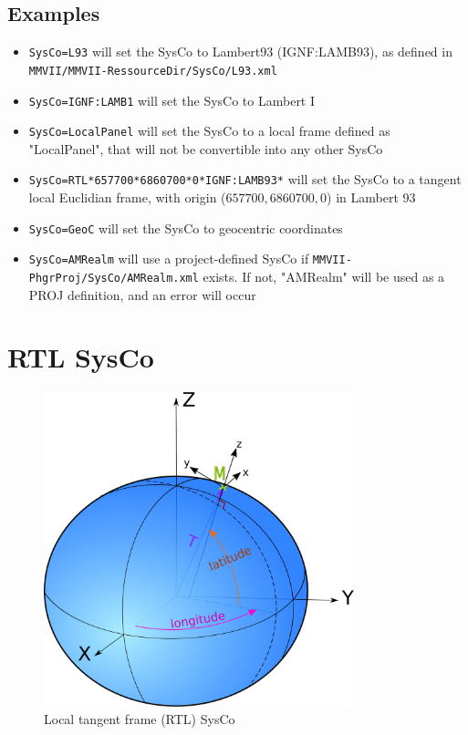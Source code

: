 \subsection{Examples}
\begin{itemize}
\item \texttt{SysCo=L93} will set the SysCo to Lambert93 (IGNF:LAMB93), as defined in \\
\texttt{MMVII/MMVII-RessourceDir/SysCo/L93.xml}
\item \texttt{SysCo=IGNF:LAMB1} will set the SysCo to Lambert I
\item \texttt{SysCo=LocalPanel} will set the SysCo to a local frame defined as "LocalPanel", that will not be convertible into any other SysCo
\item \texttt{SysCo=RTL*657700*6860700*0*IGNF:LAMB93*} will set the SysCo to a tangent local Euclidian frame, with origin ($657700, 6860700, 0$) in Lambert 93
\item \texttt{SysCo=GeoC} will set the SysCo to geocentric coordinates
\item \texttt{SysCo=AMRealm} will use a project-defined SysCo if \texttt{MMVII-PhgrProj/SysCo/AMRealm.xml} exists. If not, "AMRealm" will be used as a PROJ definition, and an error will occur

\end{itemize}


\section{RTL SysCo}
\label{SysCoRTL}

\begin{figure}[h!]
\centering
\includegraphics[width=9cm]{CommandReferences/ImagesComRef/cart_geocentr.png}
\caption{Local tangent frame (RTL) SysCo}
\label{fig:RTL}
\end{figure}



